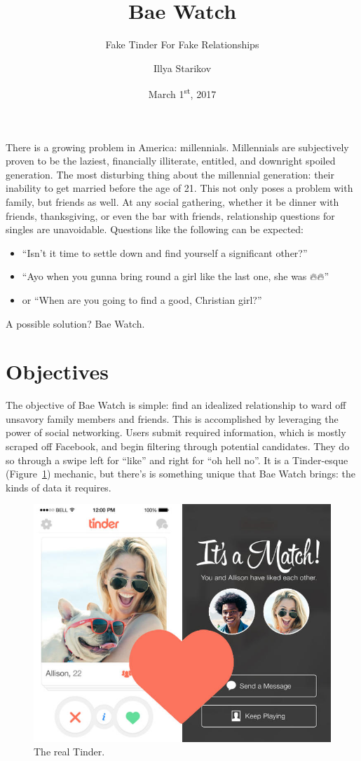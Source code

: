 \documentclass[12pt]{scrartcl}
\title{Bae Watch}
\subtitle{Fake Tinder For Fake Relationships}
\date{March 1\textsuperscript{st}, 2017}
\author{Illya Starikov}
\begin{document}
\maketitle

There is a growing problem in America: millennials. Millennials are subjectively proven to be the laziest, financially illiterate, entitled, and downright spoiled generation. The most disturbing thing about the millennial generation: their inability to get married before the age of \num{21}. This not only poses a problem with family, but friends as well. At any social gathering, whether it be dinner with friends, thanksgiving, or even the bar with friends, relationship questions for singles are unavoidable. Questions like the following can be expected: 

\begin{itemize}
    \item ``Isn't it time to settle down and find yourself a significant other?''
    \item ``Ayo when you gunna bring round a girl like the last one, she was 🔥🔥''
    \item or ``When are you going to find a good, Christian girl?''
\end{itemize}

\noindent A possible solution? Bae Watch.

\section{Objectives}
The objective of Bae Watch is simple: find an idealized relationship to ward off unsavory family members and friends. This is accomplished by leveraging the power of social networking. Users submit required information, which is mostly scraped off Facebook, and begin filtering through potential candidates. They do so through a swipe left for ``like'' and right for ``oh hell no''. It is a Tinder-esque (Figure~\ref{fig:tinder}) mechanic, but there's is something unique that Bae Watch brings: the kinds of data it requires.

\begin{figure}[!ht]
    \centering
    \includegraphics[width=.6\textwidth]{tinder}
    \caption{The real Tinder.}\label{fig:tinder}
\end{figure}
\end{document}
